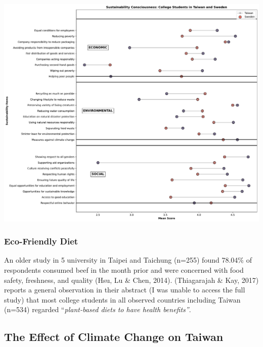 \documentclass[
  letterpaper,
  DIV=11,
  numbers=noendperiod]{scrartcl}
\begin{document}
\includegraphics{_thesis_files/figure-pdf/cell-10-output-1.pdf}

\subsubsection{Eco-Friendly Diet}\label{eco-friendly-diet}

An older study in 5 university in Taipei and Taichung (n=255) found
78.04\% of respondents consumed beef in the month prior and were
concerned with food safety, freshness, and quality (Hsu, Lu \& Chen,
2014). (Thiagarajah \& Kay, 2017) reports a general observation in their
abstract (I was unable to access the full study) that most college
students in all observed countries including Taiwan (n=534) regarded
``\emph{plant-based diets to have health benefits''}.

\subsection{The Effect of Climate Change on
Taiwan}\label{the-effect-of-climate-change-on-taiwan}
\end{document}
